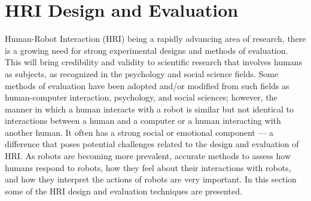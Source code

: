 
\chapter{HRI Design and Evaluation} %

\label{Chapter6} %

	Human-Robot Interaction (HRI) being a rapidly advancing area of research, there is a growing need for strong experimental designs and methods of evaluation. This will bring credibility and validity to scientific research that involves humans as subjects, as recognized in the psychology and social science fields. Some methods of evaluation have been adopted and/or modified from such fields as human-computer interaction, psychology, and social sciences; however, the manner in which a human interacts with a robot is similar but not identical to interactions between a human and a computer or a human interacting with another human. It often has a strong social or emotional component — a difference that poses potential challenges related to the design and evaluation of HRI. As robots are becoming more prevalent, accurate methods to assess how humans respond to robots, how they feel about their interactions with robots, and how they interpret the actions of robots are very important. In this section some of the HRI design and evaluation techniques are presented.

